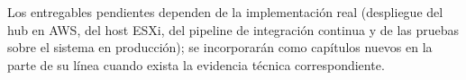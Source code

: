 \noindent Los entregables pendientes dependen de la implementación real (despliegue del
hub en AWS, del host ESXi, del pipeline de integración continua y de las pruebas
sobre el sistema en producción); se incorporarán como capítulos nuevos en la parte de
su línea cuando exista la evidencia técnica correspondiente.
